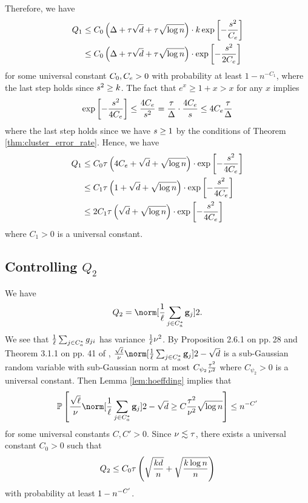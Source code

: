 Therefore, we have 
\begin{align*}
Q_{1} & \le C_{0}\left(\Delta+\tau\sqrt{d}+\tau\sqrt{\log n}\right)\cdot k\exp\left[-\frac{s^{2}}{C_{e}}\right]\\
 & \le C_{0}\left(\Delta+\tau\sqrt{d}+\tau\sqrt{\log n}\right)\cdot\exp\left[-\frac{s^{2}}{2C_{e}}\right]
\end{align*}
for some universal constant $C_{0},C_{e}>0$ with probability at
least $1-n^{-C_{1}}$, where the last step holds since $s^{2}\ge k$.
The fact that $e^{x}\ge1+x>x$ for any $x$ implies 
\[
\exp\left[-\frac{s^{2}}{4C_{e}}\right]\le\frac{4C_{e}}{s^{2}}=\frac{\tau}{\Delta}\cdot\frac{4C_{e}}{s}\le4C_{e}\frac{\tau}{\Delta}
\]
where the last step holds since we have $s\ge1$ by the conditions
of Theorem \ref{thm:cluster_error_rate}. Hence, we have 
\begin{align*}
Q_{1} & \le C_{0}\tau\left(4C_{e}+\sqrt{d}+\sqrt{\log n}\right)\cdot\exp\left[-\frac{s^{2}}{4C_{e}}\right]\\
 & \leq C_{1}\tau\left(1+\sqrt{d}+\sqrt{\log n}\right)\cdot\exp\left[-\frac{s^{2}}{4C_{e}}\right]\\
 & \leq2C_{1}\tau\left(\sqrt{d}+\sqrt{\log n}\right)\cdot\exp\left[-\frac{s^{2}}{4C_{e}}\right]
\end{align*}
where $C_{1}>0$ is a universal constant.

\subsection{Controlling $Q_{2}$}

We have 
\[
Q_{2}=\norm[\frac{1}{\size}\sum_{j\in\clustset a}\g_{j}]2.
\]
We see that $\frac{1}{\ell}\sum_{j\in C_{a}^{*}}g_{ji}$ has variance
$\frac{1}{\ell}\nu^{2}$. By Proposition 2.6.1 on pp.$\ $28 and
Theorem 3.1.1 on pp. 41 of \citet{vershynin2017high}, $\frac{\sqrt{\size}}{\std}\norm[\frac{1}{\size}\sum_{j\in\clustset a}\g_{j}]2-\sqrt{\vecdim}$
is a sub-Gaussian random variable with sub-Gaussian norm at most $C_{\psi_{2}}\frac{\tau^{2}}{\nu^{2}}$
where $C_{\psi_{2}}>0$ is a universal constant. Then Lemma \ref{lem:hoeffding}
implies that 
\[
\P\left[\frac{\sqrt{\size}}{\std}\norm[\frac{1}{\size}\sum_{j\in\clustset a}\g_{j}]2-\sqrt{\vecdim}\ge C\frac{\sgnorm^{2}}{\std^{2}}\sqrt{\log\num}\right]\le\num^{-C'}
\]
for some universal constants $C,C'>0$. Since $\nu\lesssim\tau$,
there exists a universal constant $C_{0}>0$ such that 
\[
Q_{2}\leq C_{0}\tau\left(\sqrt{\frac{kd}{n}}+\sqrt{\frac{k\log n}{n}}\right)
\]
with probability at least $1-n^{-C'}$. 

